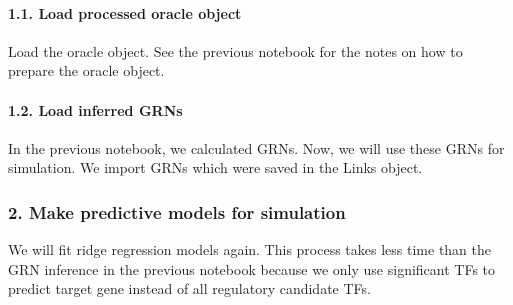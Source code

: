 \documentclass[letterpaper,10pt,english]{sphinxmanual}
\begin{document}
\paragraph{1.1. Load processed oracle object}
\label{\detokenize{notebooks/05_simulation/Gata1_KO_simulation_with_Paul_etal_2015_data:1.1.-Load-processed-oracle-object}}
Load the oracle object. See the previous notebook for the notes on how to prepare the oracle object.

{
\begin{sphinxVerbatim}[commandchars=\\\{\}]
\llap{\color{nbsphinxin}[7]:\,\hspace{\fboxrule}\hspace{\fboxsep}}  
\end{sphinxVerbatim}
}


\paragraph{1.2. Load inferred GRNs}
\label{\detokenize{notebooks/05_simulation/Gata1_KO_simulation_with_Paul_etal_2015_data:1.2.-Load-inferred-GRNs}}
In the previous notebook, we calculated GRNs. Now, we will use these GRNs for simulation. We import GRNs which were saved in the Links object.

{
\begin{sphinxVerbatim}[commandchars=\\\{\}]
\llap{\color{nbsphinxin}[8]:\,\hspace{\fboxrule}\hspace{\fboxsep}}  
\end{sphinxVerbatim}
}


\subsubsection{2. Make predictive models for simulation}
\label{\detokenize{notebooks/05_simulation/Gata1_KO_simulation_with_Paul_etal_2015_data:2.-Make-predictive-models-for-simulation}}
We will fit ridge regression models again. This process takes less time than the GRN inference in the previous notebook because we only use significant TFs to predict target gene instead of all regulatory candidate TFs.
\end{document}

